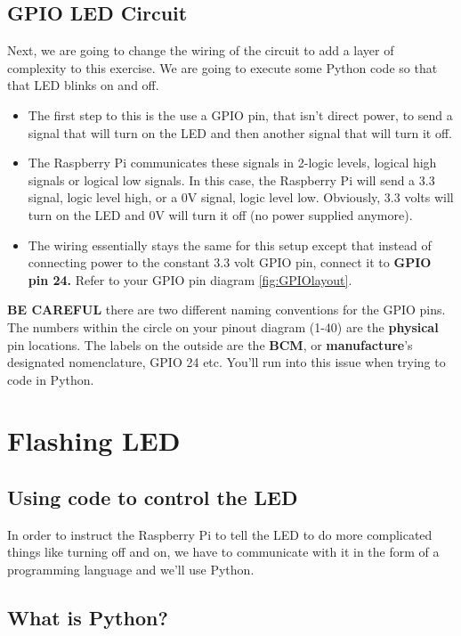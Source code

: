 \documentclass{article}\usepackage[]{graphicx}\usepackage[]{color}
\begin{document}
\subsection{GPIO LED Circuit}
Next, we are going to change the wiring of the circuit to add a layer of complexity to this exercise. We are going to execute some Python code so that that LED blinks on and off.
\begin{itemize}
\item The first step to this is the use a GPIO pin, that isn't direct power, to send a signal that will turn on the LED and then another signal that will turn it off.
\item The Raspberry Pi communicates these signals in 2-logic levels, logical high signals or logical low signals. In this case, the Raspberry Pi will send a 3.3 signal, logic level high, or a 0V signal, logic level low. Obviously, 3.3 volts will turn on the LED and 0V will turn it off (no power supplied anymore).
\item The wiring essentially stays the same for this setup except that instead of connecting power to the constant 3.3 volt GPIO pin, connect it to \textbf{GPIO pin 24.} Refer to your GPIO pin diagram \ref{fig:GPIOlayout}.
\end{itemize}
\textbf{BE CAREFUL} there are two different naming conventions for the GPIO pins. The numbers within the circle on your pinout diagram (1-40) are the \textbf{physical} pin locations. The labels on the outside are the \textbf{BCM}, or \textbf{manufacture}'s designated nomenclature, GPIO 24 etc. You'll run into this issue when trying to code in Python. \label{GPIO24}

\section{Flashing LED}

\subsection{Using code to control the LED}

In order to instruct the Raspberry Pi to tell the LED to do more complicated things like turning off and on, we have to communicate with it in the form of a programming language and we'll use Python.

\subsection{What is Python?}
\end{document}
